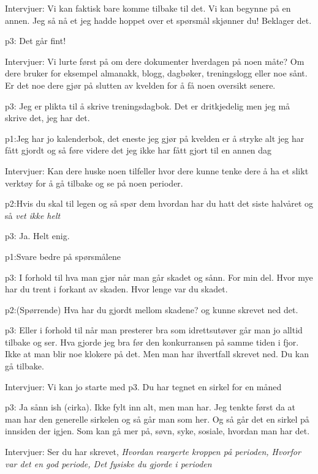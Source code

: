 \documentclass[11pt,UKenglish, a4paper]{article}
\begin{document}
\textcolor{myBlue} {Intervjuer:} Vi kan faktisk bare komme tilbake til det. Vi kan begynne på en annen. Jeg så nå et jeg hadde hoppet over et spørsmål skjønner du! Beklager det. 

\textcolor{myR} {p3:} Det går fint!

\textcolor{myBlue} {Intervjuer:} Vi lurte først på om dere dokumenter hverdagen på noen måte? Om dere bruker for eksempel almanakk, blogg, dagbøker, treningslogg eller noe sånt. Er det noe dere gjør på slutten av kvelden for å få noen oversikt senere.

\textcolor{myR} {p3:} Jeg er plikta til å skrive treningsdagbok. Det er dritkjedelig men jeg må skrive det, jeg har det.

\textcolor{myGreen} {p1:}Jeg har jo kalenderbok, det eneste jeg gjør på kvelden er å stryke alt jeg har fått gjordt og så føre videre det jeg ikke har fått gjort til en annen dag

\textcolor{myBlue} {Intervjuer:} Kan dere huske noen tilfeller hvor dere kunne tenke dere å ha et slikt verktøy for å gå tilbake og se på noen perioder.

\textcolor{myYellow} {p2:}Hvis du skal til legen og så spør dem hvordan har du hatt det siste halvåret og så \textit{vet ikke helt}

\textcolor{myR} {p3:} Ja. Helt enig.

\textcolor{myGreen} {p1:}Svare bedre på spørsmålene

\textcolor{myR} {p3:} I forhold til hva man gjør når man går skadet og sånn. For min del. Hvor mye har du trent i forkant av skaden. Hvor lenge var du skadet.

\textcolor{myYellow} {p2:}(Spørrende) Hva har du gjordt mellom skadene? og kunne skrevet ned det.

\textcolor{myR} {p3:} Eller i forhold til når man presterer bra som idrettsutøver går man jo alltid tilbake og ser. Hva gjorde jeg bra før den konkurransen på samme tiden i fjor. Ikke at man blir noe klokere på det. Men man har ihvertfall skrevet ned. Du kan gå tilbake.

\textcolor{myBlue} {Intervjuer:} Vi kan jo starte med p3. Du har tegnet en sirkel for en måned

\textcolor{myR} {p3:} Ja sånn ish (cirka). Ikke fylt inn alt, men man har. Jeg tenkte først da at man har den generelle sirkelen og så går man som her. Og så går det en sirkel på innsiden der igjen. Som kan gå mer på, søvn, syke, sosiale, hvordan man har det.

\textcolor{myBlue} {Intervjuer:} Ser du har skrevet, \textit{Hvordan reargerte kroppen på perioden, Hvorfor var det en god periode, Det fysiske du gjorde i perioden}
\end{document}
